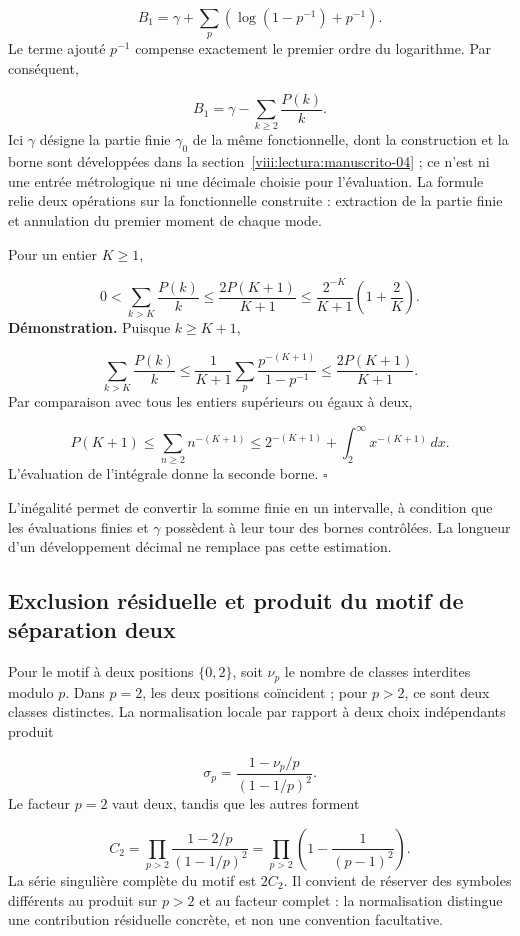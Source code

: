 \[
B_1=\gamma+\sum_p\left(\log(1-p^{-1})+p^{-1}\right).
\]
Le terme ajouté $p^{-1}$ compense exactement le premier ordre du logarithme. Par conséquent,

\[
B_1=\gamma-\sum_{k\ge2}\frac{P(k)}k.
\]
Ici $\gamma$ désigne la partie finie $\gamma_0$ de la même fonctionnelle, dont la construction et la borne sont développées dans la section~\ref{viii:lectura:manuscrito-04} ; ce n’est ni une entrée métrologique ni une décimale choisie pour l’évaluation. La formule relie deux opérations sur la fonctionnelle construite : extraction de la partie finie et annulation du premier moment de chaque mode.

Pour un entier $K\ge1$,

\[
0<\sum_{k>K}\frac{P(k)}k
\le\frac{2P(K+1)}{K+1}
\le\frac{2^{-K}}{K+1}\left(1+\frac2K\right).
\]
\textbf{Démonstration.} Puisque $k\ge K+1$,

\[
\sum_{k>K}\frac{P(k)}k
\le\frac1{K+1}\sum_p\frac{p^{-(K+1)}}{1-p^{-1}}
\le\frac{2P(K+1)}{K+1}.
\]
Par comparaison avec tous les entiers supérieurs ou égaux à deux,

\[
P(K+1)\le\sum_{n\ge2}n^{-(K+1)}
\le2^{-(K+1)}+\int_2^\infty x^{-(K+1)}\,dx.
\]
L'évaluation de l'intégrale donne la seconde borne. \hfill\(\square\)

L'inégalité permet de convertir la somme finie en un intervalle, à condition que les évaluations finies et $\gamma$ possèdent à leur tour des bornes contrôlées. La longueur d'un développement décimal ne remplace pas cette estimation.

\subsection{Exclusion résiduelle et produit du motif de séparation deux}
Pour le motif à deux positions \(\{0,2\}\), soit $\nu_p$ le nombre de classes interdites modulo $p$. Dans $p=2$, les deux positions coïncident ; pour $p>2$, ce sont deux classes distinctes. La normalisation locale par rapport à deux choix indépendants produit

\[
\sigma_p=\frac{1-\nu_p/p}{(1-1/p)^2}.
\]
Le facteur $p=2$ vaut deux, tandis que les autres forment

\[
C_2=\prod_{p>2}\frac{1-2/p}{(1-1/p)^2}
=\prod_{p>2}\left(1-\frac1{(p-1)^2}\right).
\]
La série singulière complète du motif est $2C_2$. Il convient de réserver des symboles différents au produit sur $p>2$ et au facteur complet : la normalisation distingue une contribution résiduelle concrète, et non une convention facultative.

